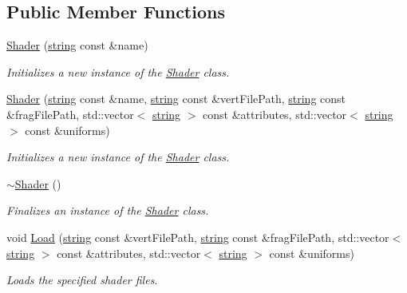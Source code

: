 \subsection*{Public Member Functions}
\begin{DoxyCompactItemize}
\item 
\hyperlink{class_shader_aa41b57af00f6041a9cadc56a297b1638}{Shader} (\hyperlink{_types_8h_ad453f9f71ce1f9153fb748d6bb25e454}{string} const \&name)
\begin{DoxyCompactList}\small\item\em Initializes a new instance of the \hyperlink{class_shader}{Shader} class. \end{DoxyCompactList}\item 
\hyperlink{class_shader_a0f91309c88cf4c51d33af996097925c2}{Shader} (\hyperlink{_types_8h_ad453f9f71ce1f9153fb748d6bb25e454}{string} const \&name, \hyperlink{_types_8h_ad453f9f71ce1f9153fb748d6bb25e454}{string} const \&vert\+File\+Path, \hyperlink{_types_8h_ad453f9f71ce1f9153fb748d6bb25e454}{string} const \&frag\+File\+Path, std\+::vector$<$ \hyperlink{_types_8h_ad453f9f71ce1f9153fb748d6bb25e454}{string} $>$ const \&attributes, std\+::vector$<$ \hyperlink{_types_8h_ad453f9f71ce1f9153fb748d6bb25e454}{string} $>$ const \&uniforms)
\begin{DoxyCompactList}\small\item\em Initializes a new instance of the \hyperlink{class_shader}{Shader} class. \end{DoxyCompactList}\item 
\hyperlink{class_shader_aff01df87e8a102f270b5b135a295e59d}{$\sim$\+Shader} ()
\begin{DoxyCompactList}\small\item\em Finalizes an instance of the \hyperlink{class_shader}{Shader} class. \end{DoxyCompactList}\item 
void \hyperlink{class_shader_a5d01e7dbbf5b35da1268a0a3a3e1ca90}{Load} (\hyperlink{_types_8h_ad453f9f71ce1f9153fb748d6bb25e454}{string} const \&vert\+File\+Path, \hyperlink{_types_8h_ad453f9f71ce1f9153fb748d6bb25e454}{string} const \&frag\+File\+Path, std\+::vector$<$ \hyperlink{_types_8h_ad453f9f71ce1f9153fb748d6bb25e454}{string} $>$ const \&attributes, std\+::vector$<$ \hyperlink{_types_8h_ad453f9f71ce1f9153fb748d6bb25e454}{string} $>$ const \&uniforms)
\begin{DoxyCompactList}\small\item\em Loads the specified shader files. \end{DoxyCompactList}\item 

\end{DoxyCompactItemize}

